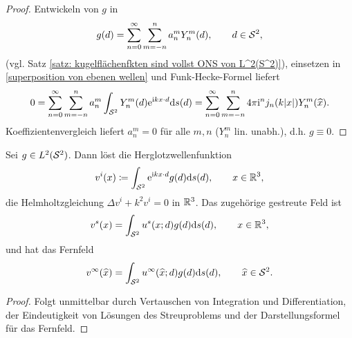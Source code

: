 \begin{proof}
	Entwickeln von \(g\) in
	\begin{equation*}
		g(d)=\sum_{n=0}^\infty\sum_{m=-n}^na_n^mY_n^m(d),\qquad d\in\mathcal{S}^2,
	\end{equation*}
	(vgl. Satz \ref{satz: kugelflächenfkten sind vollst ONS von L^2(S^2)}), einsetzen in \eqref{superposition von ebenen wellen} und Funk-Hecke-Formel liefert
	\begin{equation*}
		0
		=\sum_{n=0}^\infty\sum_{m=-n}^na_n^m\int_{\mathcal{S}^2}Y_n^m(d)\mathrm{e}^{\mathrm{i} kx\cdot d}\mathrm{d}s(d)
		=\sum_{n=0}^\infty\sum_{m=-n}^n 4\pi\mathrm{i}^nj_n(k|x|)Y_n^m(\widehat{x}).
	\end{equation*}
	Koeffizientenvergleich liefert \(a_n^m=0\) für alle \(m,n\) (\(Y_n^m\) lin. unabh.), d.h. \(g\equiv0\).
\end{proof}
\begin{lem}\label{lem: herglotzwelle löst HG}
	Sei \(g\in L^2(\mathcal{S}^2)\). Dann löst die Herglotzwellenfunktion
	\begin{equation*}
		v^i(x)\coloneqq\int_{\mathcal{S}^2}\mathrm{e}^{\mathrm{i} kx\cdot d}g(d)\mathrm{d}s(d),\qquad x\in\mathbb{R}^3,
	\end{equation*}
	die Helmholtzgleichung \(\Delta v^i+k^2v^i=0\) in \(\mathbb{R}^3\). Das zugehörige gestreute Feld ist
	\begin{equation*}
		v^s(x)=\int_{\mathcal{S}^2}u^s(x;d)g(d)\mathrm{d}s(d),\qquad x\in\mathbb{R}^3,
	\end{equation*}
	und hat das Fernfeld
	\begin{equation*}
		v^\infty(\widehat{x})=\int_{\mathcal{S}^2}u^\infty(\widehat{x};d)g(d)\mathrm{d}s(d),\qquad\widehat{x}\in\mathcal{S}^2.
	\end{equation*}
\end{lem}
\begin{proof}
	Folgt unmittelbar durch Vertauschen von Integration und Differentiation, der Eindeutigkeit von Lösungen des Streuproblems und der Darstellungsformel für das Fernfeld.
\end{proof}
